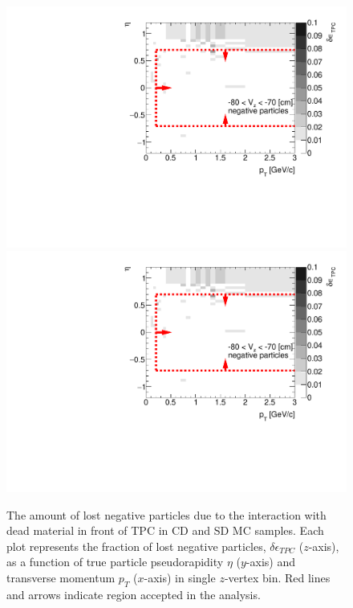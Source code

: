 \begin{figure}[H]
	\caption[The amount of lost negative particles due to the interaction with dead material in front of TPC as a function of $p_T$, $\eta$ and $z$-vertex in CD and SD]{The amount of lost negative particles due to the interaction with dead material in front of TPC in CD and SD MC samples. Each plot represents the fraction of lost negative particles, $\delta\epsilon_{ TPC}$ ($z$-axis), as a function of true particle pseudorapidity $\eta$ ($y$-axis) and transverse momentum $p_{T}$ ($x$-axis) in single $z$-vertex bin. Red lines and arrows indicate region accepted in the analysis.}\label{fig:dead_materialCDSD3Dnegative}
	\parbox{0.325\textwidth}{
		\includegraphics[width=\linewidth,page=1]{graphics/systematicsEfficiency/deadMaterial/secondaries_Unbinned_Charged_SDCD.pdf}\\
		\includegraphics[width=\linewidth,page=4]{graphics/systematicsEfficiency/deadMaterial/secondaries_Unbinned_Charged_SDCD.pdf}\\
}
\end{figure}
